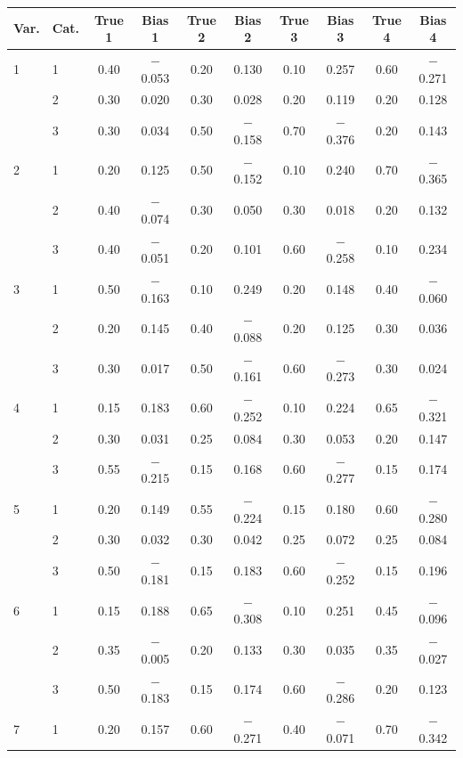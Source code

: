 \begin{longtable}{llcccccccc}
  \toprule
\textbf{Var.} & \textbf{Cat.} & \textbf{True 1} & \textbf{Bias 1} & \textbf{True 2} & \textbf{Bias 2} & \textbf{True 3} & \textbf{Bias 3} & \textbf{True 4} & \textbf{Bias 4} \\ 
  \midrule
1 & 1 & 0.40 & $-$0.053 & 0.20 & 0.130 & 0.10 & 0.257 & 0.60 & $-$0.271 \\ 
   & 2 & 0.30 & 0.020 & 0.30 & 0.028 & 0.20 & 0.119 & 0.20 & 0.128 \\ 
   & 3 & 0.30 & 0.034 & 0.50 & $-$0.158 & 0.70 & $-$0.376 & 0.20 & 0.143 \\ 
  2 & 1 & 0.20 & 0.125 & 0.50 & $-$0.152 & 0.10 & 0.240 & 0.70 & $-$0.365 \\ 
   & 2 & 0.40 & $-$0.074 & 0.30 & 0.050 & 0.30 & 0.018 & 0.20 & 0.132 \\ 
   & 3 & 0.40 & $-$0.051 & 0.20 & 0.101 & 0.60 & $-$0.258 & 0.10 & 0.234 \\ 
  3 & 1 & 0.50 & $-$0.163 & 0.10 & 0.249 & 0.20 & 0.148 & 0.40 & $-$0.060 \\ 
   & 2 & 0.20 & 0.145 & 0.40 & $-$0.088 & 0.20 & 0.125 & 0.30 & 0.036 \\ 
   & 3 & 0.30 & 0.017 & 0.50 & $-$0.161 & 0.60 & $-$0.273 & 0.30 & 0.024 \\ 
  4 & 1 & 0.15 & 0.183 & 0.60 & $-$0.252 & 0.10 & 0.224 & 0.65 & $-$0.321 \\ 
   & 2 & 0.30 & 0.031 & 0.25 & 0.084 & 0.30 & 0.053 & 0.20 & 0.147 \\ 
   & 3 & 0.55 & $-$0.215 & 0.15 & 0.168 & 0.60 & $-$0.277 & 0.15 & 0.174 \\ 
  5 & 1 & 0.20 & 0.149 & 0.55 & $-$0.224 & 0.15 & 0.180 & 0.60 & $-$0.280 \\ 
   & 2 & 0.30 & 0.032 & 0.30 & 0.042 & 0.25 & 0.072 & 0.25 & 0.084 \\ 
   & 3 & 0.50 & $-$0.181 & 0.15 & 0.183 & 0.60 & $-$0.252 & 0.15 & 0.196 \\ 
  6 & 1 & 0.15 & 0.188 & 0.65 & $-$0.308 & 0.10 & 0.251 & 0.45 & $-$0.096 \\ 
   & 2 & 0.35 & $-$0.005 & 0.20 & 0.133 & 0.30 & 0.035 & 0.35 & $-$0.027 \\ 
   & 3 & 0.50 & $-$0.183 & 0.15 & 0.174 & 0.60 & $-$0.286 & 0.20 & 0.123 \\ 
  7 & 1 & 0.20 & 0.157 & 0.60 & $-$0.271 & 0.40 & $-$0.071 & 0.70 & $-$0.342 \\ 

\end{longtable}
